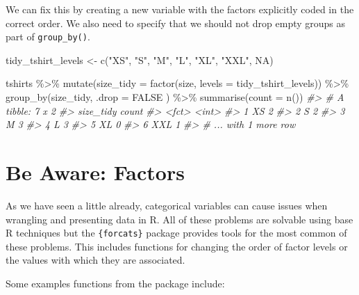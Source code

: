 \documentclass[
  12pt,
]{book}
\newenvironment{Shaded}{\begin{snugshade}}{\end{snugshade}}
\newcommand{\AttributeTok}[1]{\textcolor[rgb]{0.77,0.63,0.00}{#1}}
\newcommand{\CommentTok}[1]{\textcolor[rgb]{0.56,0.35,0.01}{\textit{#1}}}
\newcommand{\ConstantTok}[1]{\textcolor[rgb]{0.00,0.00,0.00}{#1}}
\newcommand{\FunctionTok}[1]{\textcolor[rgb]{0.00,0.00,0.00}{#1}}
\newcommand{\NormalTok}[1]{#1}
\newcommand{\OtherTok}[1]{\textcolor[rgb]{0.56,0.35,0.01}{#1}}
\newcommand{\SpecialCharTok}[1]{\textcolor[rgb]{0.00,0.00,0.00}{#1}}
\newcommand{\StringTok}[1]{\textcolor[rgb]{0.31,0.60,0.02}{#1}}
\begin{document}
We can fix this by creating a new variable with the factors explicitly coded in the correct order. We also need to specify that we should not drop empty groups as part of \texttt{group\_by()}.

\begin{Shaded}
\begin{Highlighting}[]
\NormalTok{tidy\_tshirt\_levels }\OtherTok{\textless{}{-}} \FunctionTok{c}\NormalTok{(}\StringTok{"XS"}\NormalTok{, }\StringTok{"S"}\NormalTok{, }\StringTok{"M"}\NormalTok{, }\StringTok{"L"}\NormalTok{, }\StringTok{"XL"}\NormalTok{, }\StringTok{"XXL"}\NormalTok{, }\ConstantTok{NA}\NormalTok{)}

\NormalTok{tshirts }\SpecialCharTok{\%\textgreater{}\%} 
  \FunctionTok{mutate}\NormalTok{(}\AttributeTok{size\_tidy =} \FunctionTok{factor}\NormalTok{(size, }\AttributeTok{levels =}\NormalTok{ tidy\_tshirt\_levels)) }\SpecialCharTok{\%\textgreater{}\%} 
  \FunctionTok{group\_by}\NormalTok{(size\_tidy, }\AttributeTok{.drop =} \ConstantTok{FALSE}\NormalTok{ ) }\SpecialCharTok{\%\textgreater{}\%} 
  \FunctionTok{summarise}\NormalTok{(}\AttributeTok{count =} \FunctionTok{n}\NormalTok{())}
\CommentTok{\#\textgreater{} \# A tibble: 7 x 2}
\CommentTok{\#\textgreater{}   size\_tidy count}
\CommentTok{\#\textgreater{}   \textless{}fct\textgreater{}     \textless{}int\textgreater{}}
\CommentTok{\#\textgreater{} 1 XS            2}
\CommentTok{\#\textgreater{} 2 S             2}
\CommentTok{\#\textgreater{} 3 M             3}
\CommentTok{\#\textgreater{} 4 L             3}
\CommentTok{\#\textgreater{} 5 XL            0}
\CommentTok{\#\textgreater{} 6 XXL           1}
\CommentTok{\#\textgreater{} \# ... with 1 more row}
\end{Highlighting}
\end{Shaded}

\hypertarget{be-aware-factors}{%
\section{Be Aware: Factors}\label{be-aware-factors}}

As we have seen a little already, categorical variables can cause issues when wrangling and presenting data in R. All of these problems are solvable using base R techniques but the \texttt{\{forcats\}} package provides tools for the most common of these problems. This includes functions for changing the order of factor levels or the values with which they are associated.

Some examples functions from the package include:
\end{document}
